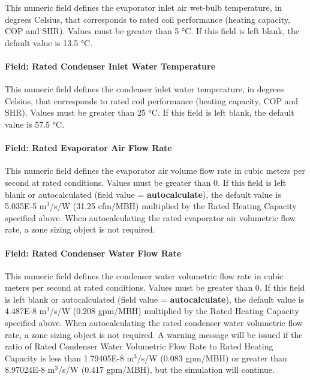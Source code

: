 This numeric field defines the evaporator inlet air wet-bulb temperature, in degrees Celsius, that corresponds to rated coil performance (heating capacity, COP and SHR). Values must be greater than 5 °C. If this field is left blank, the default value is 13.5 °C.

\paragraph{Field: Rated Condenser Inlet Water Temperature}\label{field-rated-condenser-inlet-water-temperature}

This numeric field defines the condenser inlet water temperature, in degrees Celsius, that corresponds to rated coil performance (heating capacity, COP and SHR). Values must be greater than 25 °C. If this field is left blank, the default value is 57.5 °C.

\paragraph{Field: Rated Evaporator Air Flow Rate}\label{field-rated-evaporator-air-flow-rate}

This numeric field defines the evaporator air volume flow rate in cubic meters per second at rated conditions. Values must be greater than 0. If this field is left blank or autocalculated (field value = \textbf{autocalculate}), the default value is 5.035E-5 m\(^{3}\)/s/W (31.25 cfm/MBH) multiplied by the Rated Heating Capacity specified above. When autocalculating the rated evaporator air volumetric flow rate, a zone sizing object is not required.

\paragraph{Field: Rated Condenser Water Flow Rate}\label{field-rated-condenser-water-flow-rate}

This numeric field defines the condenser water volumetric flow rate in cubic meters per second at rated conditions. Values must be greater than 0. If this field is left blank or autocalculated (field value = \textbf{autocalculate}), the default value is 4.487E-8 m\(^{3}\)/s/W (0.208 gpm/MBH) multiplied by the Rated Heating Capacity specified above. When autocalculating the rated condenser water volumetric flow rate, a zone sizing object is not required. A warning message will be issued if the ratio of Rated Condenser Water Volumetric Flow Rate to Rated Heating Capacity is less than 1.79405E-8 m\(^{3}\)/s/W (0.083 gpm/MBH) or greater than 8.97024E-8 m\(^{3}\)/s/W (0.417 gpm/MBH), but the simulation will continue.

